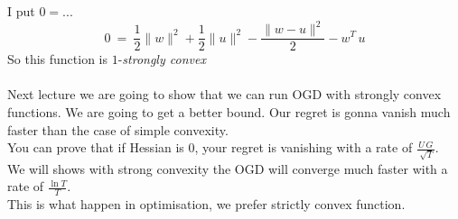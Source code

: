 \documentclass[../main.tex]{subfiles}
\begin{document}
I put $ 0 = ... $
$$
0 \ = \ \frac{1}{2} \| w\|^2 + \frac{1}{2} \|u\|^2 - \frac{\| w-u\|^2}{2} - w^T \, u
$$
So this function is $1$-\textit{strongly convex}
\\\\
Next lecture we are going to show that we can run OGD with strongly convex functions. We are going to get a better bound. Our regret is gonna vanish much faster than the case of simple convexity. 
\\
You can prove that if Hessian is 0, your regret is vanishing with a rate of $ \frac{U \, G}{\sqrt[]{T}}$.
\\
We will shows with strong convexity the OGD will converge much faster with a rate of $ \frac{ \ln T}{T}$.\\
This is what happen in optimisation, we prefer strictly convex function.
\end{document}
